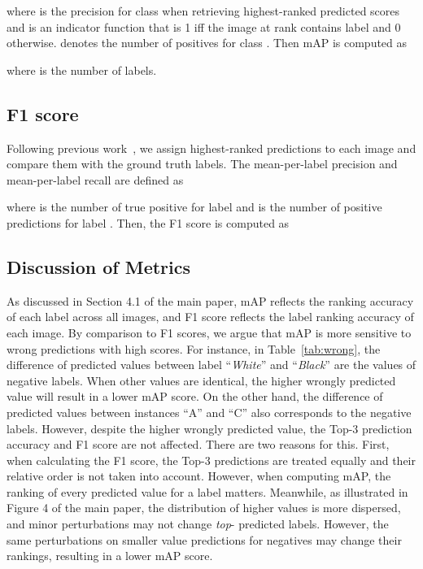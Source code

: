 \documentclass[letterpaper]{article} \usepackage{aaai23}  \usepackage{times}  \usepackage{helvet}  \usepackage{courier}  \usepackage[hyphens]{url}  \usepackage{graphicx} \urlstyle{rm} \def\UrlFont{\rm}  \usepackage{natbib}  \usepackage{caption} \frenchspacing  \setlength{\pdfpagewidth}{8.5in}  \setlength{\pdfpageheight}{11in}
\begin{document}
where  is the precision for class  when retrieving  highest-ranked predicted scores and  is an indicator function that is 1 iff the image at rank  contains label  and 0 otherwise.
 denotes the number of positives for class .
Then mAP is computed as 

where  is the number of labels.
\subsection{F1 score}
Following previous work~\cite{gong2014deep}, we assign  highest-ranked predictions to each image and compare them with the ground truth labels. 
The mean-per-label precision and mean-per-label recall are defined as 

where  is the number of true positive for label  and  is the number of positive predictions for label . Then, the F1 score is computed as



\subsection{Discussion of Metrics}
As discussed in Section 4.1 of the main paper, mAP reflects the ranking accuracy of each label across all images, and F1 score reflects the label ranking accuracy of each image.
By comparison to F1 scores, we argue that mAP is more sensitive to wrong predictions with high scores.
For instance, in Table~\ref{tab:wrong}, the difference of predicted values between label ``\textit{White}'' and ``\textit{Black}'' are the values of negative labels.
When other values are identical, the higher wrongly predicted value will result in a lower mAP score.
On the other hand, the difference of predicted values between instances ``A'' and ``C'' also corresponds to the negative labels. 
However, despite the higher wrongly predicted value, the Top-3 prediction accuracy and F1 score are not affected.
There are two reasons for this.
First, when calculating the F1 score, the Top-3 predictions are treated equally and their relative order is not taken into account.
However, when computing mAP, the ranking of every predicted value for a label matters.
Meanwhile, as illustrated in Figure 4 of the main paper, the distribution of higher values is more dispersed, and minor perturbations may not change \textit{top}- predicted labels.
However, the same perturbations on smaller value predictions for negatives may change their rankings, resulting in a lower mAP score. 
\end{document}
